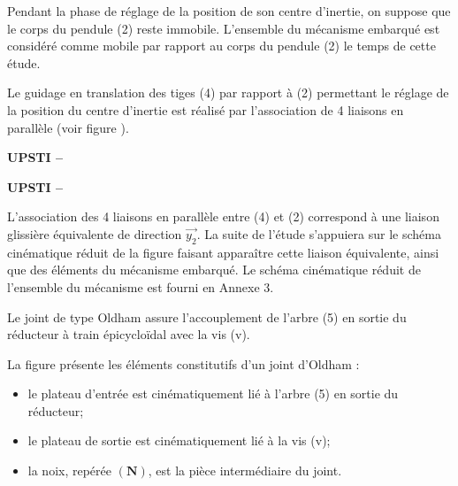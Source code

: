 Pendant la phase de réglage de la position de son centre d'inertie, on suppose que le corps du pendule (2) reste immobile. L'ensemble du mécanisme embarqué est considéré comme mobile par rapport au corps du pendule (2) le temps de cette étude.

Le guidage en translation des tiges (4) par rapport à (2) permettant le réglage de la position du centre d'inertie est réalisé par l'association de 4 liaisons en parallèle (voir figure \label{ccmp2023_fig_05}).
\fi

\ifprof
\begin{corrige}
\textbf{UPSTI -- }

\end{corrige}
\else
\fi

\ifprof
\begin{corrige}
\textbf{UPSTI -- }

\end{corrige}
\else
\fi

\ifprof
\else
L'association des 4 liaisons en parallèle entre (4) et (2) correspond à une liaison glissière équivalente de direction $\overrightarrow{y_{2}}$. La suite de l'étude s'appuiera sur le schéma cinématique réduit de la figure \label{ccmp2023_fig_06} faisant apparaître cette liaison équivalente, ainsi que des éléments du mécanisme embarqué. Le schéma cinématique réduit de l'ensemble du mécanisme est fourni en Annexe 3.

Le joint de type Oldham assure l'accouplement de l'arbre (5) en sortie du réducteur à train épicycloïdal avec la vis (v).

La figure \label{ccmp2023_fig_07} présente les éléments constitutifs d'un joint d'Oldham :

\begin{itemize}
  \item le plateau d'entrée est cinématiquement lié à l'arbre (5) en sortie du réducteur;
  \item le plateau de sortie est cinématiquement lié à la vis (v);
  \item la noix, repérée $(\mathbf{N})$, est la pièce intermédiaire du joint.
\end{itemize}

